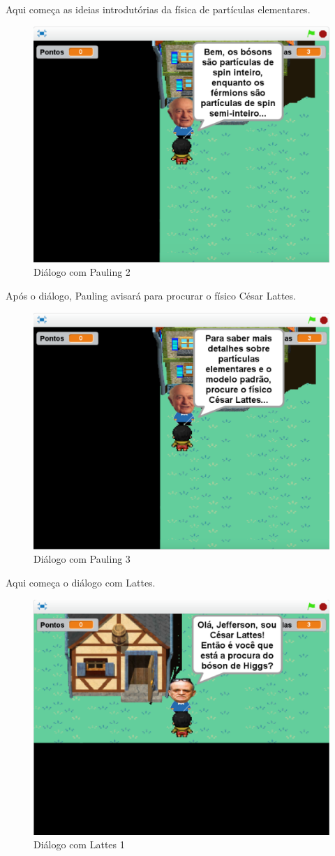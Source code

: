 \documentclass[12pt,fleqn]{book} %
\begin{document}
\newpage

Aqui começa as ideias introdutórias da física de partículas elementares.

\begin{figure}[h]
	\centering
	\includegraphics[width=0.65 \textwidth]{Produto/jogo_7}
	\caption{Diálogo com Pauling 2}
	\label{fig:app_a:jogo7}
\end{figure}

Após o diálogo, Pauling avisará para procurar o físico César Lattes.

\begin{figure}[h]
	\centering
	\includegraphics[width=0.65 \textwidth]{Produto/jogo_8}
	\caption{Diálogo com Pauling 3}
	\label{fig:app_a:jogo8}
\end{figure}

\newpage

Aqui começa o diálogo com Lattes.

\begin{figure}[h]
	\centering
	\includegraphics[width=0.65 \textwidth]{Produto/jogo_9}
	\caption{Diálogo com Lattes 1}
	\label{fig:app_a:jogo9}
\end{figure}
\end{document}
